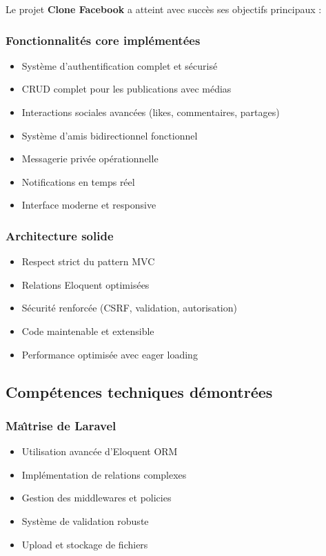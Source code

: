 \documentclass[12pt,a4paper]{article}
\begin{document}
Le projet \textbf{Clone Facebook} a atteint avec succ\`es ses objectifs principaux :

\subsubsection{Fonctionnalit\'es core impl\'ement\'ees}
\begin{itemize}
    \item Syst\`eme d'authentification complet et s\'ecuris\'e
    \item CRUD complet pour les publications avec m\'edias
    \item Interactions sociales avanc\'ees (likes, commentaires, partages)
    \item Syst\`eme d'amis bidirectionnel fonctionnel
    \item Messagerie priv\'ee op\'erationnelle
    \item Notifications en temps r\'eel
    \item Interface moderne et responsive
\end{itemize}

\subsubsection{Architecture solide}
\begin{itemize}
    \item Respect strict du pattern MVC
    \item Relations Eloquent optimis\'ees
    \item S\'ecurit\'e renforc\'ee (CSRF, validation, autorisation)
    \item Code maintenable et extensible
    \item Performance optimis\'ee avec eager loading
\end{itemize}

\subsection{Comp\'etences techniques d\'emontr\'ees}

\subsubsection{Ma\^{\i}trise de Laravel}
\begin{itemize}
    \item Utilisation avanc\'ee d'Eloquent ORM
    \item Impl\'ementation de relations complexes
    \item Gestion des middlewares et policies
    \item Syst\`eme de validation robuste
    \item Upload et stockage de fichiers
\end{itemize}
\end{document}
